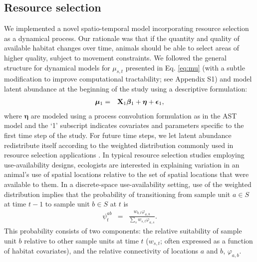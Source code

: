 \documentclass[12pt,english]{article}
\begin{document}
\begin{spacing}{1.9}
\subsection{Resource selection}

We implemented a novel spatio-temporal model incorporating resource selection as a dynamical process.  Our rationale was that if the quantity and quality of available habitat changes over time, animals should be able to select areas of higher quality, subject to movement constraints.
We followed the general structure for dynamical models for $\mu_{s,t}$ presented in Eq. \ref{eq:mu} (with a subtle modification to improve computational tractability; see Appendix S1) and model latent abundance at the beginning of the study using a descriptive formulation:
\begin{eqnarray*}
  \boldsymbol{\mu}_{1} & = & {\bf X}_{1} \boldsymbol{\beta}_1 + \boldsymbol{\eta} + \boldsymbol{\epsilon}_1,
\end{eqnarray*}
where $\boldsymbol{\eta}$ are modeled using a process convolution formulation as in the AST model and the `1' subscript indicates covariates and parameters specific to the first time step of the study.  For future time steps, we let latent abundance redistribute itself according to the weighted distribution commonly used in resource selection applications \citep[cf.][]{PatilRao1978,LeleKeim2006,JohnsonEtAl2008}.  In typical resource selection studies employing use-availability designs, ecologists are interested in explaining variation in an animal's use of spatial locations relative to the set of spatial locations that were available to them.  In a discrete-space use-availability setting, use of the weighted distribution implies that the probability of transitioning from sample unit $a \in S$ at time $t-1$ to sample unit $b \in S$ at $t$ is
\begin{eqnarray}
  \psi^{ab}_t & = & \frac{w_{b,t} \varphi_{a,b}}{\sum_s w_{s,t} \varphi_{a,s}}. \label{eq:psi}
\end{eqnarray}
This probability consists of two components: the relative suitability of sample unit $b$ relative to other sample units at time $t$ ($w_{s,t}$; often expressed as a function of habitat covariates), and the relative connectivity of locations $a$ and $b$, $\varphi_{a,b}$.


\end{spacing}
\end{document}
